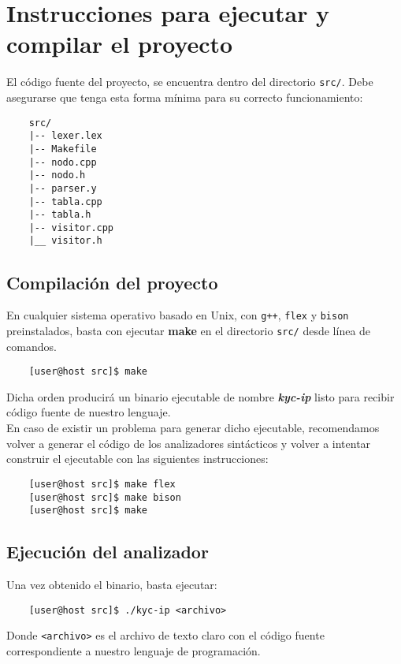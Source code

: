 \documentclass[12pt]{article}
\begin{document}
\section{Instrucciones para ejecutar y compilar el proyecto}\label{sec:s}

El código fuente del proyecto, se encuentra dentro del directorio \texttt{src/}. Debe asegurarse
que tenga esta forma mínima para su correcto funcionamiento:
\begin{verbatim}
    src/
    |-- lexer.lex
    |-- Makefile
    |-- nodo.cpp
    |-- nodo.h
    |-- parser.y
    |-- tabla.cpp
    |-- tabla.h
    |-- visitor.cpp
    |__ visitor.h

\end{verbatim}

\subsection{Compilación del proyecto}

En cualquier sistema operativo basado en Unix, con \texttt{g++}, \texttt{flex} y \texttt{bison} preinstalados, basta con ejecutar \textbf{make} en el directorio \texttt{src/} desde línea de comandos.

\begin{verbatim}
    [user@host src]$ make
\end{verbatim}
Dicha orden producirá un binario ejecutable de nombre \textit{\textbf{kyc-ip}} listo para recibir código fuente de nuestro lenguaje.\\
En caso de existir un problema para generar dicho ejecutable, recomendamos volver a generar el código de los analizadores sintácticos y volver a intentar construir el ejecutable con las siguientes instrucciones:
\begin{verbatim}
    [user@host src]$ make flex
    [user@host src]$ make bison
    [user@host src]$ make
\end{verbatim}

\subsection{Ejecución del analizador} 

Una vez obtenido el binario, basta ejecutar:
\begin{verbatim}
    [user@host src]$ ./kyc-ip <archivo>
\end{verbatim}
Donde \texttt{<archivo>} es el archivo de texto claro con el código fuente correspondiente a nuestro lenguaje de programación.
\end{document}
